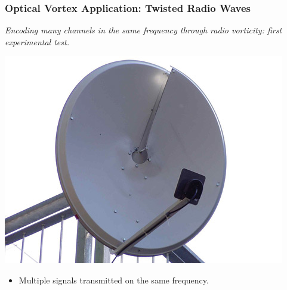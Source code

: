 \documentclass[xcolor=dvipsnames]{beamer}
\newenvironment{items}[1][]
{\begin{itemize}
    \ifthenelse{\isempty{#1}}
    {\setlength{\itemsep}{12pt}}{\setlength{\itemsep}{#1}}}
  {\end{itemize}}
\begin{document}
\begin{frame}
	\frametitle{Optical Vortex Application: Twisted Radio Waves}
	\begin{center}
		\emph{Encoding many channels in the same frequency through radio vorticity: first experimental test.}
	\end{center}
	\begin{minipage}{0.49\textwidth}
	\includegraphics[width=\textwidth]{helical_dish}
	\end{minipage}
	\begin{minipage}{0.49\textwidth}
		\begin{items}
		\item Multiple signals transmitted on the same frequency.
		\end{items}
	\end{minipage}

\end{frame}
\end{document}
